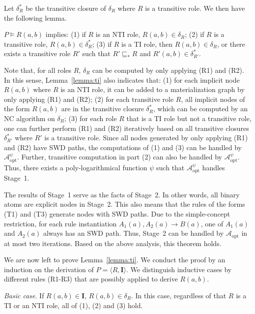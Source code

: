 Let $\delta^*_R$ be the transitive closure of $\delta_R$ where $R$ is a transitive role.
We then have the following lemma.

\begin{lemma}\label{lemma:ti}
$P\models R(a,b)$ implies: (1) if $R$ is an NTI role, $R(a,b)\in\delta_R$;
(2) if $R$ is a transitive role, $R(a,b)\in\delta^*_{R}$;
(3) if $R$ is a TI role, then $R(a,b)\in\delta_R$, or there exists a transitive
role $R'$ such that $R'\sqsubseteq_* R$ and $R'(a,b)\in\delta^*_{R'}$.
\end{lemma}

Note that, for all roles $R$, $\delta_R$ can be computed by only applying (R1) and (R2).
In this sense, Lemma~\ref{lemma:ti} also indicates that:
(1) for each implicit node $R(a,b)$ where $R$ is an NTI role,
it can be added to a materialization graph by only applying (R1) and (R2);
(2) for each transitive role $R$, all implicit nodes of the form $R(a,b)$ are in the transitive closure $\delta^*_{R}$,
which can be computed by an NC algorithm on $\delta_{R}$;
(3) for each role $R$ that is a TI role but not a transitive role,
one can further perform (R1) and (R2) iteratively based on all transitive closures $\delta^*_{R'}$
where $R'$ is a transitive role.
Since all nodes generated by only applying (R1) and (R2) have SWD paths,
the computations of (1) and (3) can be handled by $\mathcal{A}_{\text{opt}}^\psi$.
Further, transitive computation in part (2) can also be handled by $\mathcal{A}_{\text{opt}}^\psi$.
Thus, there exists a poly-logarithmical function $\psi$
such that $\mathcal{A}_{\text{opt}}^\psi$ handles Stage~1.

The results of Stage~1 serve as the facts of Stage~2. In other words, all binary atoms
are explicit nodes in Stage~2. This also means that the rules of the forms (T1) and (T3)
generate nodes with SWD paths. Due to the simple-concept restriction, for each rule
instantiation $A_1(a),A_2(a)\rightarrow B(a)$, one of $A_1(a)$ and $A_2(a)$ always has an SWD path.
Thus, Stage~2 can be handled by $\mathcal{A}_{\text{opt}}$ in at most two iterations.
Based on the above analysis, this theorem holds.

We are now left to prove Lemma~\ref{lemma:ti}. We conduct the proof by an induction on
the derivation of $P=\langle R,\textbf{I}\rangle$. We distinguish inductive cases by different rules (R1-R3)
that are possibly applied to derive $R(a,b)$.

\emph{Basic case}. If $R(a,b)\in\textbf{I}$, $R(a,b)\in\delta_{R}$. In this case,
regardless of that $R$ is a TI or an NTI role, all of (1), (2) and (3) hold.

